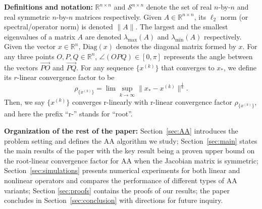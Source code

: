 \documentclass[11pt]{article}
\newcommand{\R}{\mathbb{R}}
\begin{document}
\noindent
\textbf{Definitions and notation:} $\R^{n\times n}$ and $\mathcal{S}^{n\times n}$ denote the set of real $n$-by-$n$ and real symmetric $n$-by-$n$ matrices respectively. Given $A\in\R^{n\times n}$, its $\ell_2$ norm (or spectral/operator norm) is denoted $\|A\|$. 
The largest and the smallest eigenvalues of a matrix $A$ are denoted $\lambda_{\max}(A)$ and $\lambda_{\min}(A)$ respectively. 
Given the vector $x \in \R^n$, $\text{Diag}(x)$ denotes the diagonal matrix formed by $x$. 
For any three points $O, P, Q\in\R^n$, $\angle(OPQ)\in [0,\pi]$ represents the angle between the vectors $\vec{PO}$ and $\vec{PQ}$. For any sequence $\{x^{(k)}\}$ that converges to $x_*$, we define its  $r$-linear convergence factor to be  
\[
\rho_{\{x^{(k)}\}}=\lim\sup_{k\rightarrow\infty}\|x_*-x^{(k)}\|^{\frac{1}{k}}.
\]
Then, we say $\{x^{(k)}\}$ converges r-linearly with r-linear convergence factor $\rho_{\{x^{(k)}\}}$, and here the prefix ``r-'' stands for ``root''. 

\noindent
\textbf{Organization of the rest of the paper:} 
Section~\ref{sec:AA} introduces the problem setting and defines the AA algorithm we study; 
Section~\ref{sec:main} states the main results of the paper with the key result being a proven upper bound on the root-linear convergence factor for AA when the Jacobian matrix is symmetric; Section~\ref{sec:simulations} presents numerical experiments for both linear and nonlinear operators and compares the performance of different types of AA variants; Section \ref{sec:proofs} contains the proofs of our results; the paper concludes in Section~\ref{sec:conclusion} with directions for future inquiry. 


\end{document}
